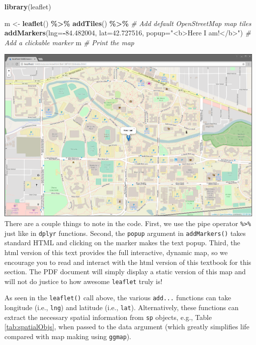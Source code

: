 \documentclass[
]{krantz}
\makeatletter
\newenvironment{Shaded}{\begin{snugshade}}{\end{snugshade}}
\newcommand{\CommentTok}[1]{\textcolor[rgb]{0.37,0.37,0.37}{\textit{#1}}}
\newcommand{\DataTypeTok}[1]{\textcolor[rgb]{0.27,0.27,0.27}{#1}}
\newcommand{\FloatTok}[1]{\textcolor[rgb]{0.06,0.06,0.06}{#1}}
\newcommand{\KeywordTok}[1]{\textcolor[rgb]{0.27,0.27,0.27}{\textbf{#1}}}
\newcommand{\NormalTok}[1]{#1}
\newcommand{\OperatorTok}[1]{\textcolor[rgb]{0.43,0.43,0.43}{\textbf{#1}}}
\newcommand{\StringTok}[1]{\textcolor[rgb]{0.5,0.5,0.5}{#1}}
\newenvironment{kframe}{%
\medskip{}
\setlength{\fboxsep}{.8em}
 \def\at@end@of@kframe{}%
 \ifinner\ifhmode%
  \def\at@end@of@kframe{\end{minipage}}%
  \begin{minipage}{\columnwidth}%
 \fi\fi%
 \def\FrameCommand##1{\hskip\@totalleftmargin \hskip-\fboxsep
 \colorbox{shadecolor}{##1}\hskip-\fboxsep
     \hskip-\linewidth \hskip-\@totalleftmargin \hskip\columnwidth}%
 \MakeFramed {\advance\hsize-\width
   \@totalleftmargin\z@ \linewidth\hsize
   \@setminipage}}%
 {\par\unskip\endMakeFramed%
 \at@end@of@kframe}
\renewenvironment{Shaded}{\begin{kframe}}{\end{kframe}}
\makeatother
\begin{document}
\begin{Shaded}
\begin{Highlighting}[]
\KeywordTok{library}\NormalTok{(leaflet)}

\NormalTok{m \textless{}{-}}\StringTok{ }\KeywordTok{leaflet}\NormalTok{() }\OperatorTok{\%\textgreater{}\%}
\StringTok{      }\KeywordTok{addTiles}\NormalTok{() }\OperatorTok{\%\textgreater{}\%}\StringTok{  }\CommentTok{\# Add default OpenStreetMap map tiles}
\StringTok{      }\KeywordTok{addMarkers}\NormalTok{(}\DataTypeTok{lng=}\OperatorTok{{-}}\FloatTok{84.482004}\NormalTok{, }\DataTypeTok{lat=}\FloatTok{42.727516}\NormalTok{, }
                 \DataTypeTok{popup=}\StringTok{"\textless{}b\textgreater{}Here I am!\textless{}/b\textgreater{}"}\NormalTok{) }\CommentTok{\# Add a clickable marker}
\NormalTok{m      }\CommentTok{\# Print the map}
\end{Highlighting}
\end{Shaded}

\includegraphics[width=1\linewidth]{../figures/leaflet-here-i-am}
There are a couple things to note in the code. First, we use the pipe operator \texttt{\%\textgreater{}\%} just like in \texttt{dplyr} functions. Second, the \texttt{popup} argument in \texttt{addMarkers()} takes standard HTML and clicking on the marker makes the text popup. Third, the html version of this text provides the full interactive, dynamic map, so we encourage you to read and interact with the html version of this textbook for this section. The PDF document will simply display a static version of this map and will not do justice to how awesome \texttt{leaflet} truly is!

As seen in the \texttt{leaflet()} call above, the various \texttt{add...} functions can take longitude (i.e., \texttt{lng}) and latitude (i.e., \texttt{lat}). Alternatively, these functions can extract the necessary spatial information from \texttt{sp} objects, e.g., Table \ref{tab:spatialObjs}, when passed to the data argument (which greatly simplifies life compared with map making using \texttt{ggmap}).
\end{document}

